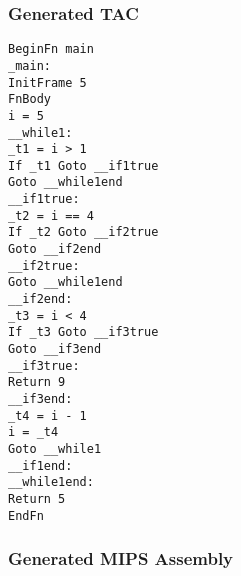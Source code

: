 \subsubsection{Generated TAC}
\begin{lstlisting}[showstringspaces=false,breaklines=true,backgroundcolor=\color{light-gray}, captionpos=b]
BeginFn main
_main:
InitFrame 5
FnBody
i = 5
__while1:
_t1 = i > 1
If _t1 Goto __if1true
Goto __while1end
__if1true:
_t2 = i == 4
If _t2 Goto __if2true
Goto __if2end
__if2true:
Goto __while1end
__if2end:
_t3 = i < 4
If _t3 Goto __if3true
Goto __if3end
__if3true:
Return 9
__if3end:
_t4 = i - 1
i = _t4
Goto __while1
__if1end:
__while1end:
Return 5
EndFn

\end{lstlisting}\subsubsection{Generated MIPS Assembly}
